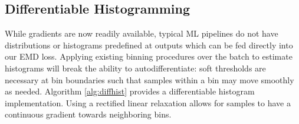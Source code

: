 \subsection{Differentiable Histogramming}\label{sec:supphist}
\iffalse
\begin{algorithm}
\caption{Differentiable Histograms}\label{alg:diffhist}
\begin{algorithmic}[1] \footnotesize
\Function {Init}{$n$} {\em \hspace*{\fill} // bins, (discretization)}
    \State $r := 1/n$ {\em \hspace*{\fill} // bin size}
    \State $locs := arange(0, 1, r)$ {\em \hspace*{\fill} // bin boundaries}
\EndFunction
\Function {Forward}{$acts$}
    \State $cdfs = \sigma(acts)$ {\em \hspace*{\fill} // compute CDFs}
    \State $counts = []$
    \For{loc in locs}
        \State $dist = \lvert cdfs - loc \rvert$ {\em \hspace*{\fill} // dist. to boundary}
        \State $ct = \underset{i\in[nbins]}{\sum} \operatorname{ReLU}(r - dist[i])$ {\em \hspace*{\fill} // soft bucket count}
        \State $counts.append(ct)$
    \EndFor
    \State $out = stack(counts)$
    \State $out = out/sum(out)$
    \State \Return $out$
\EndFunction
\end{algorithmic}
\end{algorithm}
\fi

While gradients are now readily available, typical ML pipelines do not have distributions or histograms predefined at outputs which can be fed directly into 
our EMD loss. Applying existing binning procedures over the batch to estimate histograms will break the ability to autodifferentiate: soft thresholds are necessary at bin boundaries such that samples within a bin may move smoothly as needed. Algorithm \ref{alg:diffhist} provides a differentiable histogram implementation. Using a rectified linear relaxation allows for samples to have a continuous gradient towards neighboring bins.